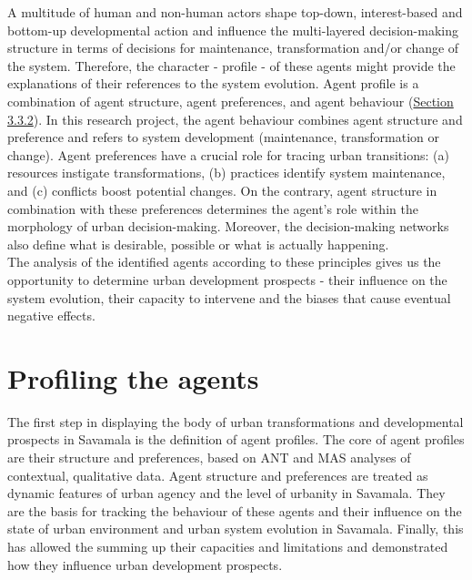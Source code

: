 \documentclass[11pt]{report}
\begin{document}
{{{{A multitude of human and non-human actors shape top-down, interest-based and bottom-up developmental action and influence the multi-layered decision-making structure in terms of decisions for maintenance, transformation and/or change of the system. 
Therefore, the character - profile - of these agents might provide the explanations of their references to the system evolution.
Agent profile is a combination of agent structure, agent preferences, and agent behaviour (\href{Section 3.3.2}{Section 3.3.2}).
In this research project, the agent behaviour combines agent structure and preference and refers to system development (maintenance, transformation or change). 
Agent preferences have a crucial role for tracing urban transitions:
(a) resources instigate transformations,
(b) practices identify system maintenance,
and
(c) conflicts boost potential changes.
On the contrary, agent structure in combination with these preferences determines the agent's role within the morphology of urban decision-making.
Moreover, the decision-making networks also define what is desirable, possible or what is actually happening.
\\

The analysis of the identified agents according to these principles gives us the opportunity to determine urban development prospects - their influence on the system evolution, their capacity to intervene and the biases that cause eventual negative effects.

\section{Profiling the agents}

The first step in displaying the body of urban transformations and developmental prospects in Savamala is the definition of agent profiles.
The core of agent profiles are their structure and preferences, based on ANT and MAS analyses of contextual, qualitative data. Agent structure and preferences are treated as dynamic features of urban agency and the level of urbanity in Savamala.
They are the basis for tracking the behaviour of these agents and their influence on the state of urban environment and urban system evolution in Savamala.
Finally, this has allowed the summing up their capacities and limitations and demonstrated how they influence urban development prospects.
\\

}}}}
\end{document}
